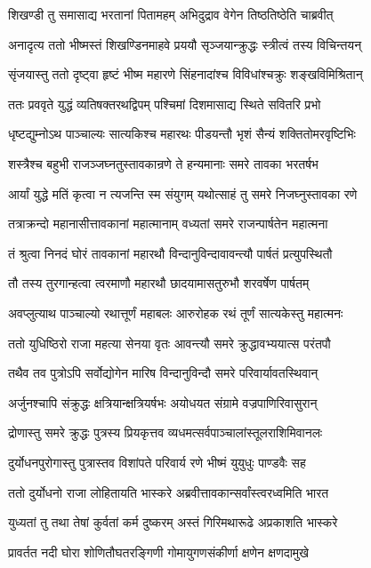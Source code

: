 \twolineshloka
{शिखण्डी तु समासाद्य भरतानां पितामहम्}
{अभिदुद्राव वेगेन तिष्ठतिष्ठेति चाब्रवीत्}


\twolineshloka
{अनादृत्य ततो भीष्मस्तं शिखण्डिनमाहवे}
{प्रययौ सृञ्जयान्क्रुद्धः स्त्रीत्वं तस्य विचिन्तयन्}


\twolineshloka
{सृंजयास्तु ततो दृष्ट्वा हृष्टं भीष्म महारणे}
{सिंहनादांश्च विविधांश्चक्रुः शङ्खविमिश्रितान्}


\twolineshloka
{ततः प्रववृते युद्धं व्यतिषक्तरथद्विपम्}
{पश्चिमां दिशमासाद्य स्थिते सवितरि प्रभो}


\twolineshloka
{धृष्टद्युम्नोऽथ पाञ्चाल्यः सात्यकिश्च महारथः}
{पीडयन्तौ भृशं सैन्यं शक्तितोमरवृष्टिभिः}


\twolineshloka
{शस्त्रैश्च बहुभी राजञ्जघ्नतुस्तावकान्रणे}
{ते हन्यमानाः समरे तावका भरतर्षभ}


\twolineshloka
{आर्यां युद्धे मतिं कृत्वा न त्यजन्ति स्म संयुगम्}
{यथोत्साहं तु समरे निजघ्नुस्तावका रणे}


\twolineshloka
{तत्राक्रन्दो महानासीत्तावकानां महात्मानाम्}
{वध्यतां समरे राजन्पार्षतेन महात्मना}


\twolineshloka
{तं श्रुत्वा निनदं घोरं तावकानां महारथौ}
{विन्दानुविन्दावावन्त्यौ पार्षतं प्रत्युपस्थितौ}


\twolineshloka
{तौ तस्य तुरगान्हत्वा त्वरमाणौ महारथौ}
{छादयामासतुरुभौ शरवर्षेण पार्षतम्}


\twolineshloka
{अवप्लुत्याथ पाञ्चाल्यो रथात्तूर्णं महाबलः}
{आरुरोहक रथं तूर्णं सात्यकेस्तु महात्मनः}


\twolineshloka
{ततो युधिष्ठिरो राजा महत्या सेनया वृतः}
{आवन्त्यौ समरे क्रुद्धावभ्ययात्स परंतपौ}


\twolineshloka
{तथैव तव पुत्रोऽपि सर्वोद्योगेन मारिष}
{विन्दानुविन्दौ समरे परिवार्यावतस्थिवान्}


\twolineshloka
{अर्जुनश्चापि संक्रुद्धः क्षत्रियान्क्षत्रियर्षभः}
{अयोधयत संग्रामे वज्रपाणिरिवासुरान्}


\twolineshloka
{द्रोणास्तु समरे क्रुद्धः पुत्रस्य प्रियकृत्तव}
{व्यधमत्सर्वपाञ्चालांस्तूलराशिमिवानलः}


\twolineshloka
{दुर्योधनपुरोगास्तु पुत्रास्तव विशांपते}
{परिवार्य रणे भीष्मं युयुधुः पाण्डवैः सह}


\twolineshloka
{ततो दुर्योधनो राजा लोहितायति भास्करे}
{अब्रवीत्तावकान्सर्वांस्त्वरध्वमिति भारत}


\twolineshloka
{युध्यतां तु तथा तेषां कुर्वतां कर्म दुष्करम्}
{अस्तं गिरिमथारूढे अप्रकाशति भास्करे}


\twolineshloka
{प्रावर्तत नदी घोरा शोणितौघतरङ्गिणी}
{गोमायुगणसंकीर्णा क्षणेन क्षणदामुखे}


